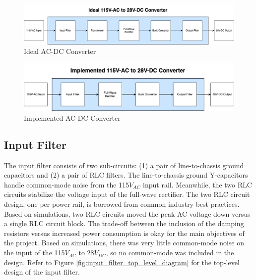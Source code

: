 \documentclass[conference]{IEEEtran}
\begin{document}
\begin{figure}[htbp]
    \centering
    \includegraphics[width=1.0\linewidth]{ac_dc_converter_ideal.png}
    \caption{Ideal AC-DC Converter}
    \label{fig:ac_dc_converter_ideal_diagram}
\end{figure}

\begin{figure}[h]
    \centering
    \includegraphics[width=1.0\linewidth]{ac_dc_converter_implemented.png}
    \caption{Implemented AC-DC Converter}
    \label{fig:ac_dc_converter_implemented_diagram}
\end{figure}

\subsection{Input Filter}

The input filter consists of two sub-circuits: (1) a pair of line-to-chassis ground capacitors and (2) a pair of RLC filters. The line-to-chassis ground Y-capacitors handle common-mode noise from the 115$V_{AC}$ input rail. Meanwhile, the two RLC circuits stabilize the voltage input of the full-wave rectifier. The two RLC circuit design, one per power rail, is borrowed from common industry best practices. Based on simulations, two RLC circuits moved the peak AC voltage down versus a single RLC circuit block. The trade-off between the inclusion of the damping resistors versus increased power consumption is okay for the main objectives of the project. Based on simulations, there was very little common-mode noise on the input of the 115$V_{AC}$ to 28$V_{DC}$, so no common-mode was included in the design. Refer to Figure \ref{fig:input_filter_top_level_diagram} for the top-level design of the input filter. 
\end{document}
